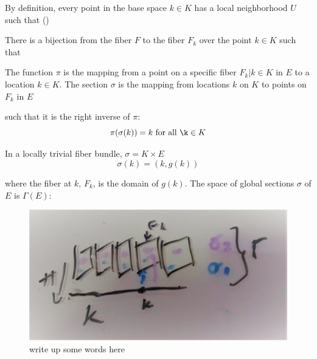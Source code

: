 \documentclass[../main.tex]{subfiles}
\begin{document}


By definition, every point in the base space $k \in K$ has a local neighborhood $U$ such that \pi()
\cite{rowlandFiberBundle,FiberBundle2020}



There is a bijection from the fiber $F$ to the fiber $F_k$ over the point $k \in K$ such that 
\begin{equation}
\end{equation}


The function $\pi$ is the mapping from a point on a specific fiber $F_{k}|k\in K$ in $E$ to a location $k \in K$. The section $\sigma$ is the mapping from locations $k$ on $K$ to points on $F_{k}$ in $E$


such that it is the right inverse of $\pi$:
\begin{equation}
    \pi(\sigma(k)) = k \text{ for all } \k \in K 
\end{equation}

In a locally trivial fiber bundle, $\sigma = K \times E$   \cite{weissteinFiberBundle}
\begin{equation}
\sigma(k) = (k, g(k))
\end{equation}

where the fiber at $k$, $F_k$,  is the domain of $g(k)$.  The space of global sections $\sigma$ of $E$ is $\Gamma(E)$:

\begin{figure}[ht]
    \label{fig:fiberbundle}
    \includegraphics[width=.2\linewidth]{figures/sections/math/fiberbundle.png}
    \caption{write up some words here}
\end{figure}
\end{document}

